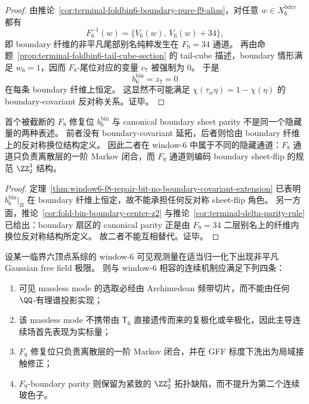\begin{proof}
由推论~\ref{cor:terminal-foldbin6-boundary-pure-f9-alias}，对任意 \(w\in X_6^{\mathrm{bdry}}\) 都有
\[
F_6^{-1}(w)=\{V_6(w),\,V_6(w)+34\},
\]
即 boundary 纤维的非平凡尾部别名纯粹发生在 \(F_9=34\) 通道。
再由命题~\ref{prop:terminal-foldbin6-tail-cube-section} 的 tail-cube 描述，boundary 情形满足 \(w_6=1\)，因而 \(F_8\)-尾位对应的变量 \(c_7\) 被强制为 \(0\)。
于是
\[
b^{\mathrm{bin}}_6=z_7=0
\]
在每条 boundary 纤维上恒定。
这显然不可能满足
\(
\chi(\tau_w\eta)=1-\chi(\eta)
\)
的 boundary-covariant 反对称关系。证毕。
\end{proof}

\begin{corollary}\label{cor:window6-f8-repair-vs-f9-boundary-parity-separated}
首个被截断的 \(F_8\) 修复位 \(b^{\mathrm{bin}}_6\) 与 canonical boundary sheet parity 不是同一个隐藏量的两种表述。
前者没有 boundary-covariant 延拓，后者则恰由 boundary 纤维上的反对称换位结构定义。
因此二者在 window-\(6\) 中属于不同的隐藏通道：\(F_8\) 通道只负责离散层的一阶 Markov 闭合，而 \(F_9\) 通道则编码 boundary sheet-flip 的规范 \(\ZZ_2^3\) 结构。
\end{corollary}

\begin{proof}
定理~\ref{thm:window6-f8-repair-bit-no-boundary-covariant-extension} 已表明 \(b^{\mathrm{bin}}_6|_B\) 在 boundary 纤维上恒定，故不能承担任何反对称 sheet-flip 角色。
另一方面，推论~\ref{cor:fold-bin-boundary-center-z2} 与推论~\ref{cor:terminal-delta-parity-rule} 已给出：boundary 扇区的 canonical parity 正是由 \(F_9=34\) 二层别名上的纤维内换位反对称结构所定义。
故二者不能互相替代。证毕。
\end{proof}

\begin{conjecture}\label{conj:window6-archimedean-mode-selection-f8-f9-separation}
设某一临界六顶点系综的 window-\(6\) 可见观测量在适当归一化下出现非平凡 Gaussian free field 极限。
则与 window-\(6\) 相容的连续机制应满足下列四条：
\begin{enumerate}
  \item 可见 massless mode 的选取必经由 Archimedean 频带切片，而不能由任何 \(\QQ\)-有理谱投影实现；
  \item 该 massless mode 不携带由 \(\mathsf T_6\) 直接遗传而来的复极化或辛极化，因此主导连续场首先表现为实标量；
  \item \(F_8\) 修复位只负责离散层的一阶 Markov 闭合，并在 GFF 标度下洗出为局域接触修正；
  \item \(F_9\)-boundary parity 则保留为紧致的 \(\ZZ_2^3\) 拓扑缺陷，而不提升为第二个连续玻色子。
\end{enumerate}
\end{conjecture}
